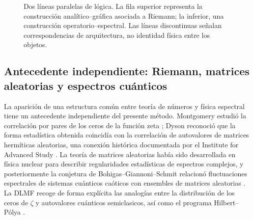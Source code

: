 \documentclass[11pt]{amsart}
\theoremstyle{definition}
\theoremstyle{remark}
\begin{document}
\begin{figure}[H]
\centering
{}
\caption{Dos líneas paralelas de lógica. La fila superior representa la construcción analítico--gráfica asociada a Riemann; la inferior, una construcción operatorio--espectral. Las líneas discontinuas señalan correspondencias de arquitectura, no identidad física entre los objetos.}
\label{fig:parallel-lines}
\end{figure}

\subsection{Antecedente independiente: Riemann, matrices aleatorias y espectros cuánticos}
La aparición de una estructura común entre teoría de números y física espectral tiene un antecedente independiente del presente método. Montgomery estudió la correlación por pares de los ceros de la función zeta \cite{Montgomery1973}; Dyson reconoció que la forma estadística obtenida coincidía con la correlación de autovalores de matrices hermíticas aleatorias, una conexión histórica documentada por el Institute for Advanced Study \cite{IASDyson}. La teoría de matrices aleatorias había sido desarrollada en física nuclear para describir regularidades estadísticas de espectros complejos, y posteriormente la conjetura de Bohigas--Giannoni--Schmit relacionó fluctuaciones espectrales de sistemas cuánticos caóticos con ensembles de matrices aleatorias \cite{BGS1984}. La DLMF recoge de forma explícita las analogías entre la distribución de los ceros de $\zeta$ y autovalores cuánticos semiclasicos, así como el programa Hilbert--P\'olya \cite{DLMFphysical}.
\end{document}
